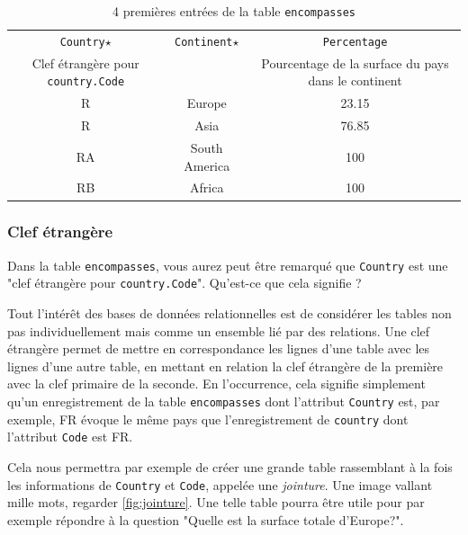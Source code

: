 \begin{table}[h!]
	\begin{tabular}{|ccc|}
		\hline
		\texttt{Country}$ \star $                 & \texttt{Continent}$ \star $ & \texttt{Percentage}                                 \\
		Clef étrangère pour \texttt{country.Code} &                             & Pourcentage de la surface du pays dans le continent \\ \hline
		R                                         & Europe                      & 23.15                                               \\
		R                                         & Asia                        & 76.85                                               \\
		RA                                        & South America               & 100                                                 \\
		RB                                        & Africa                      & 100                                                 \\ \hline
	\end{tabular}
	\caption{4 premières entrées de la table \texttt{encompasses}}
	\label{tab:encompasses}
\end{table}
\subsubsection*{Clef étrangère}

Dans la table \texttt{encompasses}, vous aurez peut être remarqué que \texttt{Country} est une "clef étrangère pour \texttt{country.Code}". Qu'est-ce que cela signifie ?

Tout l'intérêt des bases de données relationnelles est de considérer les tables non pas individuellement mais comme un ensemble lié par des relations. Une clef étrangère permet de mettre en correspondance les lignes d'une table avec les lignes d'une autre table, en mettant en relation la clef étrangère de la première avec la clef primaire de la seconde. En l'occurrence, cela signifie simplement qu'un enregistrement de la table \texttt{encompasses} dont l'attribut \texttt{Country} est, par exemple, FR évoque le même pays que l'enregistrement de \texttt{country} dont l'attribut \texttt{Code} est FR.

Cela nous permettra par exemple de créer une grande table rassemblant à la fois les informations de \texttt{Country} et \texttt{Code}, appelée une \textit{jointure}. Une image vallant mille mots, regarder \autoref{fig:jointure}. Une telle table pourra être utile pour par exemple répondre à la question "Quelle est la surface totale d'Europe?".

